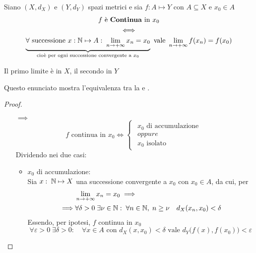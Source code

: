 \begin{proposition}
	\label{prop:cont_e_cont_per_succ}
	Siano $(X,d_X)$ e $(Y,d_Y)$ spazi metrici e sia $f: A \mapsto Y$ con $A \subseteq X$ e $x_0 \in A$
	\begin{equation*}
		\begin{gathered}
			f \text{ è \textbf{Continua} in } x_0\\
			\iff\\
			\underbrace{\forall \text{ successione } x:\mathbb{N} \mapsto A:\; \lim\limits_{n \to +\infty} x_n = x_0}_{\text{cioè per ogni successione convergente a } x_0} \text{ vale } \lim\limits_{n \to +\infty} f(x_n) = f(x_0)
		\end{gathered}
	\end{equation*}
	\begin{note}
		Il primo limite è in $X$, il secondo in $Y$
	\end{note}
	\begin{note}
		Questo enunciato mostra l'equivalenza tra la  e .
	\end{note}
	\begin{proof}~
		\begin{itemize}
			\item[$\implies$]
			$$f \text{ continua in } x_0 \iff
				\begin{cases}
					\begin{array}{c}
						x_0 \text{ di accumulazione}\\
						oppure\\
						x_0 \text{ isolato}
					\end{array}
				\end{cases}$$
				Dividendo nei due casi:
				\begin{itemize}
					\item $x_0$ di accumulazione:\\
						Sia $x:\; \mathbb{N} \mapsto X$ una successione convergente a $x_0$ con $x_0 \in A$, da cui, per 
						\begin{align*}
							& \lim\limits_{n \to +\infty} x_n = x_0 \implies\\
							\implies & \forall \delta > 0\; \exists \nu \in \mathbb{N}:\; \forall n \in \mathbb{N},\; n \geq \nu \quad d_X(x_n, x_0) < \delta
						\end{align*}
						Essendo, per ipotesi, $f$ continua in $x_0$
						\begin{equation*}
							\forall \varepsilon > 0\; \exists \delta > 0:\quad \forall x \in A \text{ con } d_X(x,x_0)<\delta \text{ vale } d_Y \bigl(f(x),f(x_0)\bigr) < \varepsilon

\end{equation*}
\end{itemize}
\end{itemize}
\end{proof}
\end{proposition}
